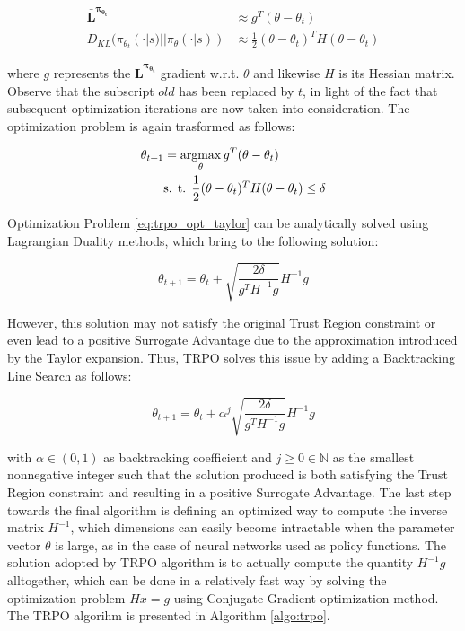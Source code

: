                 \begin{align}
                    \mathbf{\bar{L}^{\pi_{\theta_{t}}}} &\approx g^{T}(\theta - \theta_{t})\\
                    D_{KL} ( \pi_{\theta_{t}}(\cdot|s) || \pi_{\theta} (\cdot|s) ) &\approx \frac{1}{2} (\theta - \theta_{t})^{T}H(\theta - \theta_{t})
                \end{align}
                
                where $g$ represents the $\mathbf{\bar{L}^{\pi_{\theta_{t}}}}$ gradient w.r.t. $\theta$ and likewise $H$ is its Hessian matrix. Observe that the subscript $old$ has been replaced by $t$, in light of the fact that subsequent optimization iterations are now taken into consideration. The optimization problem is again trasformed as follows:
                
                \begin{align}
                    \label{eq:trpo_opt_taylor}
                    \theta_{t+1} &= \operatorname*{argmax}_{\theta} g^{T}(\theta - \theta_{t}) \\
                    & \text{s. t. } \frac{1}{2} (\theta - \theta_{t})^{T}H(\theta - \theta_{t}) \leq \delta \nonumber
                \end{align}
                
                Optimization Problem \ref{eq:trpo_opt_taylor} can be analytically solved using Lagrangian Duality methods, which bring to the following solution:
                
                \[ \theta_{t+1} = \theta_{t} + \sqrt{\frac{2\delta}{g^{T}H^{-1}g}} H^{-1}g\]
                
                However, this solution may not satisfy the original Trust Region constraint or even lead to a positive Surrogate Advantage due to the approximation introduced by the Taylor expansion. Thus, TRPO solves this issue by adding a Backtracking Line Search as follows:
                
                \[ \theta_{t+1} = \theta_{t} + \alpha^{j} \sqrt{\frac{2\delta}{g^{T}H^{-1}g}} H^{-1}g\]
                
                with $\alpha \in (0, 1)$ as backtracking coefficient and $j \geq 0 \in \mathbb{N}$ as the smallest nonnegative integer such that the solution produced is both satisfying the Trust Region constraint and resulting in a positive Surrogate Advantage. \newline
                The last step towards the final algorithm is defining an optimized way to compute the inverse matrix $H^{-1}$, which dimensions can easily become intractable when the parameter vector $\theta$ is large, as in the case of neural networks used as policy functions. The solution adopted by TRPO algorithm is to actually compute the quantity $H^{-1}g$ alltogether, which can be done in a relatively fast way by solving the optimization problem $Hx = g$ using Conjugate Gradient optimization method. The TRPO algorihm is presented in Algorithm \ref{algo:trpo}.
                
